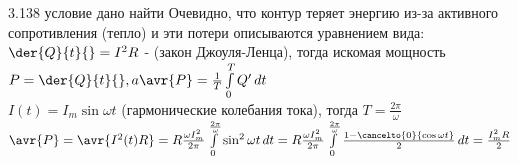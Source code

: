 \testCom
{%
	3.138
}
{%
	условие
}
{%
	дано
}
{%
	найти
}
{%
	Очевидно, что контур теряет энергию из-за активного сопротивления (тепло) и эти потери описываются уравнением вида:\\
	$\der{Q}{t}{} = I^2 R$ - (закон Джоуля-Ленца), тогда искомая мощность $P = \der{Q}{t}{}, a \avr{P} = \frac{1}{T} \int\limits_0^T Q' \, dt$\\
	$I(t) = I_m \sin \omega t$ (гармонические колебания тока), тогда $T = \frac{2 \pi}{\omega}$\\
	$\avr{P} = \avr{I^2 (t) R} = R \frac{\omega I_m^2 }{2 \pi} \int\limits_0^{\frac{2 \pi}{\omega}} \sin^2 \omega t \, dt = R \frac{\omega I_m^2 }{2 \pi} \int\limits_0^{\frac{2 \pi}{\omega}} \frac{1 - \cancelto{0}{\cos \omega t}}{2} \, dt = \frac{I_m^2 R}{2}$\\
}

